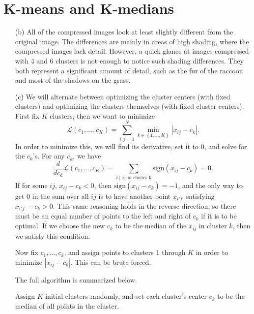 \documentclass{article}
\begin{document}

\section{K-means and K-medians}

\begin{enumerate}
	\item[(b)] 
		All of the compressed images look at least slightly different from the original image. The differences are mainly in areas of high shading, where the compressed images lack detail. However, a quick glance at images compressed with 4 and 6 clusters is not enough to notice such shading differences. They both represent a significant amount of detail, such as the fur of the raccoon and most of the shadows on the grass.

	\item[(c)]
		We will alternate between optimizing the cluster centers (with fixed clusters) and optimizing the clusters themselves (with fixed cluster centers). First fix $K$ clusters, then we want to minimize
		\[
			\mathcal{L}(c_1, \dots, c_K) = \sum_{i,j=1}^{N} \min_{k\in \left\{ 1,\dots,K \right\}} |x_{ij}-c_k|.
		\] 
		In order to minimize this, we will find its derivative, set it to 0, and solve for the $c_k$'s. For any $c_k$, we have
		\[
			\frac{d }{d c_k} \mathcal{L}(c_1,\dots,c_K) = \sum_{i \;|\; x_i \text{ in cluster k}} \text{sign}(x_{ij}-c_k) = 0.
		\]
		If for some $ij$, $x_{ij} - c_k < 0$, then $\text{sign}(x_{ij}-c_k) = -1$, and the only way to get 0 in the sum over all $ij$ is to have another point $x_{i'j'}$ satisfying $x_{i'j'} - c_k > 0$. This same reasoning holds in the reverse direction, so there must be an equal number of points to the left and right of $c_k$ if it is to be optimal. If we choose the new $c_k$ to be the median of the  $x_{ij}$ in cluster $k$, then we satisfy this condition.

		Now fix $c_1,\dots,c_k$, and assign points to clusters 1 through $K$ in order to minimize $|x_{ij} - c_k|$. This can be brute forced.

		The full algorithm is summarized below.

		\begin{minipage}{\linewidth}
                \begin{algorithm}[H]
			Assign $K$ initial clusters randomly, and set each cluster's center $c_k$ to be the median of all points in the cluster.
\end{algorithm}
\end{minipage}
\end{enumerate}
\end{document}
